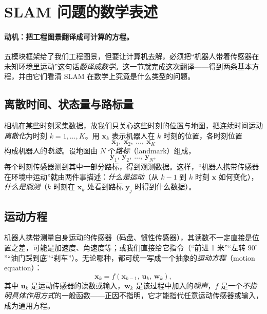 \section{SLAM 问题的数学表述}
\label{sec:intro-math}

\paragraph{动机：把工程图景翻译成可计算的方程。}
五模块框架给了我们工程图景，但要让计算机去解，必须把“机器人带着传感器在未知环境里运动”这句话\emph{翻译成数学}。这一节就完成这次翻译——得到两条基本方程，并由它们看清 SLAM 在数学上究竟是什么类型的问题。

\subsection{离散时间、状态量与路标量}
\label{sec:intro-discrete}
相机在某些时刻采集数据，故我们只关心这些时刻的位置与地图，把连续时间运动\emph{离散化}为时刻 $k=1,\dots,K$\cite{gaoxiang2019slam14}。用 $\mathbf{x}_k$ 表示机器人在 $k$ 时刻的位置，各时刻位置
\begin{equation}
  \mathbf{x}_1,\ \mathbf{x}_2,\ \dots,\ \mathbf{x}_K
  \label{eq:intro-traj}
\end{equation}
构成机器人的\emph{轨迹}。设地图由 $N$ 个\emph{路标}（landmark）组成，
\begin{equation}
  \mathbf{y}_1,\ \mathbf{y}_2,\ \dots,\ \mathbf{y}_N,
  \label{eq:intro-landmarks}
\end{equation}
每个时刻传感器测到其中一部分路标，得到观测数据。这样，“机器人携带传感器在环境中运动”就由两件事描述：\emph{什么是运动}（从 $k-1$ 到 $k$ 时刻 $\mathbf{x}$ 如何变化），\emph{什么是观测}（$k$ 时刻在 $\mathbf{x}_k$ 处看到路标 $\mathbf{y}_j$ 时得到什么数据）。

\subsection{运动方程}
\label{sec:intro-motion}
机器人携带测量自身运动的传感器（码盘、惯性传感器），其读数不一定直接是位置之差，可能是加速度、角速度等；或我们直接给它指令（“前进 1 米”“左转 $90^\circ$”“油门踩到底”“刹车”）。无论哪种，都可统一写成一个抽象的\emph{运动方程}（motion equation）\cite{gaoxiang2019slam14}：
\begin{equation}
  \mathbf{x}_k = f\!\left(\mathbf{x}_{k-1},\, \mathbf{u}_k,\, \mathbf{w}_k\right),
  \label{eq:intro-motion}
\end{equation}
其中 $\mathbf{u}_k$ 是运动传感器的读数或输入，$\mathbf{w}_k$ 是该过程中加入的\emph{噪声}，$f$ 是一个\emph{不指明具体作用方式}的一般函数——正因不指明，它才能指代任意运动传感器或输入，成为通用方程。

